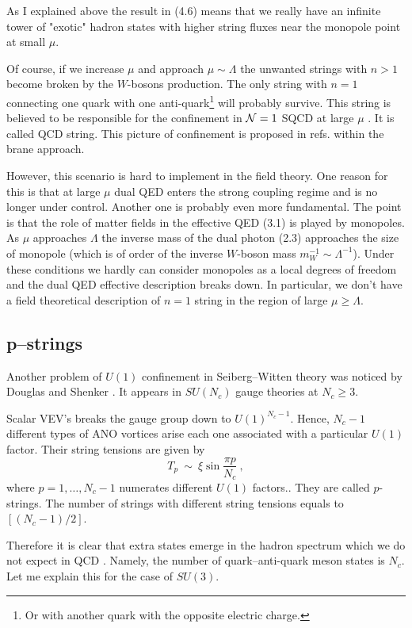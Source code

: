 \documentclass[a4paper,12pt]{article}
\begin{document}
As I explained above
the result in (4.6) means that we really have an infinite tower of
"exotic" hadron states with higher string fluxes near the
monopole point at small $\mu $.

Of course, if we increase $\mu $ and approach
$\mu \sim\Lambda$  the unwanted strings with $n>1$ become
broken by the $W$-bosons production. The only string with $n=1$
connecting one quark with one anti-quark\footnote{Or with another
quark with the opposite electric charge.} will probably survive.
This string is believed to be responsible for the confinement in
${\cal N}=1$ SQCD at large $\mu $ .
It is called QCD string. This picture of confinement is proposed
in refs.\cite{W,HSZ}
 within the brane approach.

However, this scenario is hard to implement in the field
theory. One reason for this is that at large $\mu $ dual QED
enters the strong coupling regime and is no longer under control.
 Another one is probably even
more fundamental. The point is that  the role of matter fields
in the effective QED (3.1) is played by monopoles. As $\mu $
approaches $\Lambda$ the inverse mass of the dual photon (2.3)
approaches the size of monopole (which is of order of the inverse
$W$-boson mass $m^{-1}_W\sim\Lambda^{-1}$). Under these
conditions we hardly can consider monopoles as a local degrees
of freedom and the dual QED effective description breaks down.
In particular, we don't have a field theoretical description of
$n=1$ string in the region of large $\mu \ge\Lambda$.

\subsection{p--strings}

Another problem of $U(1)$ confinement in Seiberg--Witten theory
was noticed by Douglas and Shenker \cite{DS}. It appears in
$SU(N_c)$ gauge theories at $N_c\ge3$.

Scalar VEV's breaks the gauge group down to $U(1)^{N_c-1}$.
Hence, $N_c-1$ different types of ANO vortices arise  each
one associated with a particular
$U(1)$ factor. Their string tensions are given by \cite{DS}
\begin{equation}
T_p\ \sim\ \xi\sin\frac{\pi p}{N_c}\ ,
\end{equation}
where $p=1,\ldots, N_c-1$ numerates different $U(1)$ factors..
They are called $p$-strings. The number of strings with
different string tensions equals to $[(N_c-1)/2]$.

Therefore it is clear that extra states emerge in the hadron
spectrum which we do not expect in QCD \cite{DS}. Namely, the
number of quark--anti-quark meson states is $N_c$. Let me explain
this for the case of $SU(3)$.
\end{document}
